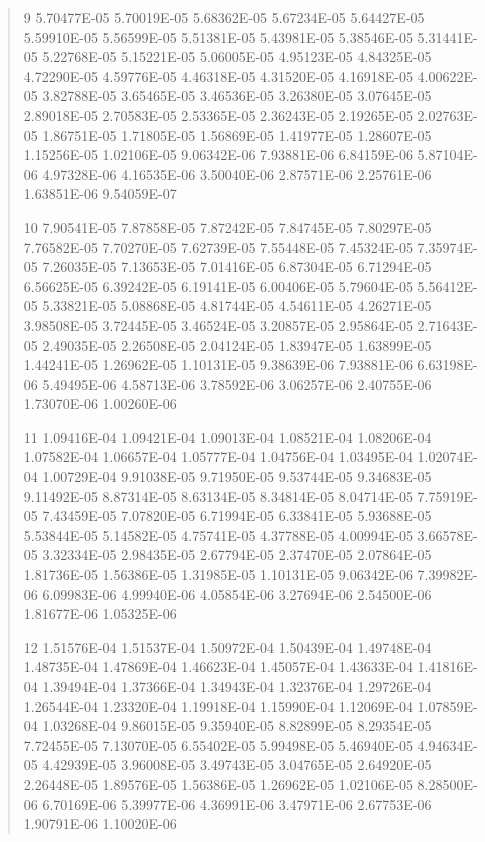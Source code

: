 \documentclass[letterpaper,10pt,english]{sphinxmanual}
\begin{document}
\begin{quote}
\begin{DUlineblock}{0em}
\begin{DUlineblock}{\DUlineblockindent}
\item[] 9   5.70477E-05  5.70019E-05  5.68362E-05  5.67234E-05  5.64427E-05  5.59910E-05  5.56599E-05  5.51381E-05  5.43981E-05  5.38546E-05  5.31441E-05  5.22768E-05  5.15221E-05  5.06005E-05  4.95123E-05  4.84325E-05  4.72290E-05  4.59776E-05  4.46318E-05  4.31520E-05  4.16918E-05  4.00622E-05  3.82788E-05  3.65465E-05  3.46536E-05  3.26380E-05  3.07645E-05  2.89018E-05  2.70583E-05  2.53365E-05  2.36243E-05  2.19265E-05  2.02763E-05  1.86751E-05  1.71805E-05  1.56869E-05  1.41977E-05  1.28607E-05  1.15256E-05  1.02106E-05  9.06342E-06  7.93881E-06  6.84159E-06  5.87104E-06  4.97328E-06  4.16535E-06  3.50040E-06  2.87571E-06  2.25761E-06  1.63851E-06  9.54059E-07
\end{DUlineblock}
\item[] 10   7.90541E-05  7.87858E-05  7.87242E-05  7.84745E-05  7.80297E-05  7.76582E-05  7.70270E-05  7.62739E-05  7.55448E-05  7.45324E-05  7.35974E-05  7.26035E-05  7.13653E-05  7.01416E-05  6.87304E-05  6.71294E-05  6.56625E-05  6.39242E-05  6.19141E-05  6.00406E-05  5.79604E-05  5.56412E-05  5.33821E-05  5.08868E-05  4.81744E-05  4.54611E-05  4.26271E-05  3.98508E-05  3.72445E-05  3.46524E-05  3.20857E-05  2.95864E-05  2.71643E-05  2.49035E-05  2.26508E-05  2.04124E-05  1.83947E-05  1.63899E-05  1.44241E-05  1.26962E-05  1.10131E-05  9.38639E-06  7.93881E-06  6.63198E-06  5.49495E-06  4.58713E-06  3.78592E-06  3.06257E-06  2.40755E-06  1.73070E-06  1.00260E-06
\item[] 11   1.09416E-04  1.09421E-04  1.09013E-04  1.08521E-04  1.08206E-04  1.07582E-04  1.06657E-04  1.05777E-04  1.04756E-04  1.03495E-04  1.02074E-04  1.00729E-04  9.91038E-05  9.71950E-05  9.53744E-05  9.34683E-05  9.11492E-05  8.87314E-05  8.63134E-05  8.34814E-05  8.04714E-05  7.75919E-05  7.43459E-05  7.07820E-05  6.71994E-05  6.33841E-05  5.93688E-05  5.53844E-05  5.14582E-05  4.75741E-05  4.37788E-05  4.00994E-05  3.66578E-05  3.32334E-05  2.98435E-05  2.67794E-05  2.37470E-05  2.07864E-05  1.81736E-05  1.56386E-05  1.31985E-05  1.10131E-05  9.06342E-06  7.39982E-06  6.09983E-06  4.99940E-06  4.05854E-06  3.27694E-06  2.54500E-06  1.81677E-06  1.05325E-06
\item[] 12   1.51576E-04  1.51537E-04  1.50972E-04  1.50439E-04  1.49748E-04  1.48735E-04  1.47869E-04  1.46623E-04  1.45057E-04  1.43633E-04  1.41816E-04  1.39494E-04  1.37366E-04  1.34943E-04  1.32376E-04  1.29726E-04  1.26544E-04  1.23320E-04  1.19918E-04  1.15990E-04  1.12069E-04  1.07859E-04  1.03268E-04  9.86015E-05  9.35940E-05  8.82899E-05  8.29354E-05  7.72455E-05  7.13070E-05  6.55402E-05  5.99498E-05  5.46940E-05  4.94634E-05  4.42939E-05  3.96008E-05  3.49743E-05  3.04765E-05  2.64920E-05  2.26448E-05  1.89576E-05  1.56386E-05  1.26962E-05  1.02106E-05  8.28500E-06  6.70169E-06  5.39977E-06  4.36991E-06  3.47971E-06  2.67753E-06  1.90791E-06  1.10020E-06

\end{DUlineblock}
\end{quote}
\end{document}
